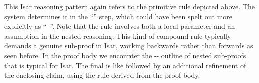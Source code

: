 \begin{isabellebody}
\begin{minipage}{0.4\textwidth}
\begin{isamarkuptext}
\end{isamarkuptext}%
\isamarkuptrue%
%
\end{minipage}
%
\begin{isamarkuptext}%
\medskip\noindent This Isar reasoning pattern again refers to the
  primitive rule depicted above.  The system determines it in the
  ``\hyperlink{command.proof}{\mbox{}}'' step, which could have been spelt out more
  explicitly as ``\hyperlink{command.proof}{\mbox{}}~''.  Note
  that the rule involves both a local parameter  and an
  assumption  in the nested reasoning.  This kind of
  compound rule typically demands a genuine sub-proof in Isar, working
  backwards rather than forwards as seen before.  In the proof body we
  encounter the \hyperlink{command.fix}{\mbox{}}-\hyperlink{command.assume}{\mbox{}}-\hyperlink{command.show}{\mbox{}}
  outline of nested sub-proofs that is typical for Isar.  The final
  \hyperlink{command.show}{\mbox{}} is like \hyperlink{command.have}{\mbox{}} followed by an additional
  refinement of the enclosing claim, using the rule derived from the
  proof body.


\end{isamarkuptext}
\end{isabellebody}
